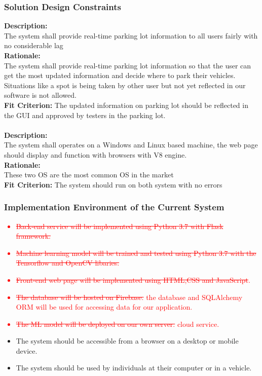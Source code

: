 \documentclass[12pt,letterpaper]{article}
\newcommand{\term}[2][]{\ifthenelse{\equal{#1}{}}{\hyperref[Term:#2]{\textbf{#2}}}{\hyperref[Term:#1]{\textbf{#2}}}}
\begin{document}
\subsubsection{Solution Design Constraints}
\noindent \textbf{Description:} \\ The system shall provide real-time parking
lot information to all users fairly with no considerable lag \\
\textbf{Rationale:} \\  The system shall provide real-time parking lot
information so that the user can get the most updated information and decide
where to park their vehicles. Situations like a spot is being taken by other
user but not yet reflected in our software is not allowed. \\
\textbf{Fit Criterion:} The updated information on parking lot should be
reflected in the GUI and approved by testers in the parking lot. \\
\\
\noindent \textbf{Description:} \\ The system shall operates on a Windows and
Linux based machine, the web page should display and function with browsers with
V8 engine. \\
\textbf{Rationale:} \\  These two OS are the most common OS in the market \\
\textbf{Fit Criterion:} The system should run on both system with no errors 

\subsubsection{Implementation Environment of the Current System}
\textcolor{red}{
\begin{itemize}
    \item \st{Back-end service will be implemented  using Python 3.7 with Flask
    framework.}
    \item \st{Machine learning model will be trained and tested using Python 3.7
    with the Tensorflow and OpenCV libaries.}
    \item \st{Front-end web page will be implemented using HTML,CSS and
    JavaScript}.%
    \item \st{The database will be hosted on Firebase.} %
    the database and SQLAlchemy ORM will be used for accessing data for our
    application.
    \item \st{The ML model will be deployed on our own server.} %
    cloud service.
\end{itemize}
}
\begin{itemize}
    \item The system should be accessible from a browser on a desktop or mobile
    device.
    \item The system should be used by individuals at their computer or in a
    vehicle.
\end{itemize}
\end{document}

